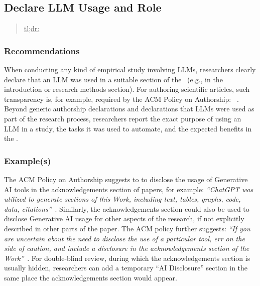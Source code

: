 



\subsection{Declare LLM Usage and Role}
\label{sec:declare-llm-usage-and-role}

\begin{quote}
\underline{tl;dr:}  
\end{quote}

\subsubsection{Recommendations}

When conducting any kind of empirical study involving LLMs, researchers \must clearly declare that an LLM was used in a suitable section of the \paper~(e.g., in the introduction or research methods section).
For authoring scientific articles, such transparency is, for example, required by the ACM Policy on Authorship: ~\cite{ACM2023}.
Beyond generic authorship declarations and declarations that LLMs were used as part of the research process, researchers \should report the exact purpose of using an LLM in a study, the tasks it was used to automate, and the expected benefits in the \paper.


\subsubsection{Example(s)}

The ACM Policy on Authorship suggests to to disclose the usage of Generative AI tools in the acknowledgements section of papers, for example: \emph{``ChatGPT was utilized to generate sections of this Work, including text, tables, graphs, code, data, citations''}~\cite{ACM2023}. 
Similarly, the acknowledgements section could also be used to disclose Generative AI usage for other aspects of the research, if not explicitly described in other parts of the paper.
The ACM policy further suggests: \emph{``If you are uncertain ­about the need to disclose the use of a particular tool, err on the side of caution, and include a disclosure in the acknowledgements section of the Work''}~\cite{ACM2023}.
For double-blind review, during which the acknowledgements section is usually hidden, researchers can add a temporary ``AI Disclosure'' section in the same place the acknowledgements section would appear. 

